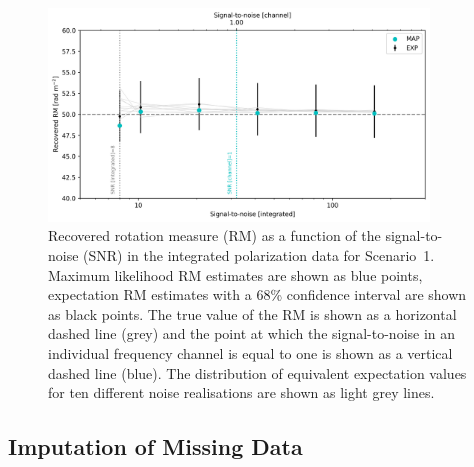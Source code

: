 \documentclass[fleqn,usenatbib]{mnras}
\begin{document}
%
\begin{figure}
\centerline{\includegraphics[width=0.9\textwidth]{./FIGURES/figure4.png}}
\caption{\label{fig:rm_snr} Recovered rotation measure (RM) as a function of the signal-to-noise (SNR) in the integrated polarization data for Scenario~1. Maximum likelihood RM estimates are shown as blue points, expectation RM estimates with a 68\% confidence interval are shown as black points. The true value of the RM is shown as a horizontal dashed line (grey) and the point at which the signal-to-noise in an individual frequency channel is equal to one is shown as a vertical dashed line (blue). The distribution of equivalent expectation values for ten different noise realisations are shown as light grey lines.}
\end{figure}


\subsection{Imputation of Missing Data}
\label{sec:missing}
\end{document}
